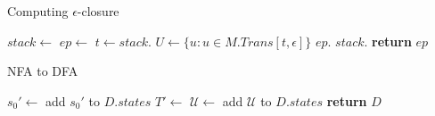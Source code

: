 \documentclass{beamer}
\begin{document}
\begin{frame}{Computing $\epsilon$-closure}
\footnotesize
\begin{algorithmic}[0]
\pause
  \State $stack \gets$ 
  \State $ep \gets$ 
    \State $t \gets stack$.
    \State $U \gets \{u : u \in M.Trans[t, \epsilon]\}$
        \State $ep$.
        \State $stack$.
      \EndIf
    \EndFor
  \EndWhile
  \State \textbf{return} $ep$
\EndProcedure

\end{algorithmic}

\end{frame}

\begin{frame}{NFA to DFA}
\begin{footnotesize}
\begin{algorithmic}[0]
\pause
  \State $s_0' \gets$ 
  \State add $s_0'$ to $D.states$
  \State {}
    \State {}
    	  \State $T' \gets$ 
      \State $\mathcal{U} \gets$ 
        \State add $\mathcal{U}$ to $D.states$
        \State {}
      \EndIf
    \EndFor
  \EndWhile
  \State \textbf{return} $D$
\EndProcedure

\end{algorithmic}
\end{footnotesize}
\end{frame}
\end{document}
